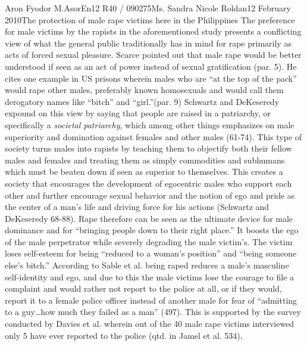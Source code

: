 \documentclass[12pt,letterpaper]{article}
\begin{document}
\begin{mla}{Aron Fyodor M.}{Asor}{En12 R40 / 090275}{Ms. Sandra Nicole Roldan}{12 February 2010}{The protection of male rape victims here in the Philippines}
%
%
The preference for male victims by the rapists in the aforementioned study presents a conflicting view of what the general public traditionally has in mind for rape primarily as acts of forced sexual pleasure. Scarce pointed out that male rape would be better understood if seen as an act of power instead of sexual gratification (par. 5). He cites one example in US prisons wherein males who are ``at the top of the pack'' would rape other males, preferably known homosexuals and would call them derogatory names like ``bitch'' and ``girl.''(par. 9) Schwartz and DeKeseredy expound on this view by saying that people are raised in a patriarchy, or specifically a \textit{societal patriarchy}, which among other things emphasizes on male superiority and domination against females and other males (61-74). This type of society turns males into rapists by teaching them to objectify both their fellow males and females and treating them as simply commodities and subhumans which must be beaten down if seen as superior to themselves. This creates a society that encourages the development of egocentric males who support each other and further encourage sexual behavior and the notion of ego and pride as the center of a man's life and driving force for his actions (Schwartz and DeKeseredy 68-88). Rape therefore can be seen as the ultimate device for male dominance and for ``bringing people down to their right place.'' It boosts the ego of the male perpetrator while severely degrading the male victim's. The victim loses self-esteem for being ``reduced to a woman's position'' and ``being someone else's bitch.'' According to Sable et al. being raped reduces a male's masculine self-identity and ego, and due to this the male victims lose the courage to file a complaint and would rather not report to the police at all, or if they would, report it to a female police officer instead of another male for fear of ``admitting to a guy\ldots how much they failed as a man'' (497). This is supported by the survey conducted by Davies et al. wherein out of the 40 male rape victims interviewed only 5 have ever reported to the police (qtd. in Jamel et al. 534).
%
%

\end{mla}
\end{document}
